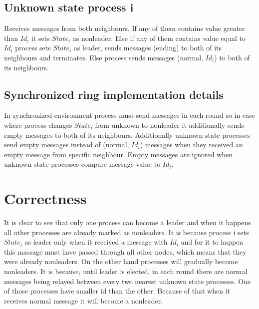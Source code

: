 \documentclass{article}
\begin{document}
\subsection*{Unknown state process i}
Receives messages from both neighbours. \newline
If any of them contains value greater than $Id_{i}$ it sets $State_{i}$ as nonleader. \newline
Else if any of them contains value equal to $Id_{i}$ process sets $State_{i}$ as leader, sends messages (ending) to both of its neighbours and terminates. \newline
Else process sends messages (normal, $Id_{i}$) to both of its neighbours.

\subsection*{Synchronized ring implementation details}
In synchronized environment process must send messages in each round so in case where process changes $State_{i}$ from unknown to nonleader it additionally sends empty messages to both of its neighbours. Additionally unknown state processes send empty messages instead of (normal, $Id_{i}$) messages when they received an empty message from specific neighbour. Empty messages are ignored when unknown state processes compare message value to $Id_{i}$.

\section*{Correctness}
It is clear to see that only one process can become a leader and when it happens all other processes are already marked as nonleaders. It is because process i sets $State_{i}$ as leader only when it received a message with $Id_{i}$ and for it to happen this massage must have passed through all other nodes, which means that they were already nonleaders.
On the other hand processes will gradually become nonleaders. It is because, until leader is elected, in each round there are normal messages being relayed between every two nearest unknown state processes. One of those processes have smaller id than the other. Because of that when it receives normal message it will become a nonleader.
\end{document}
